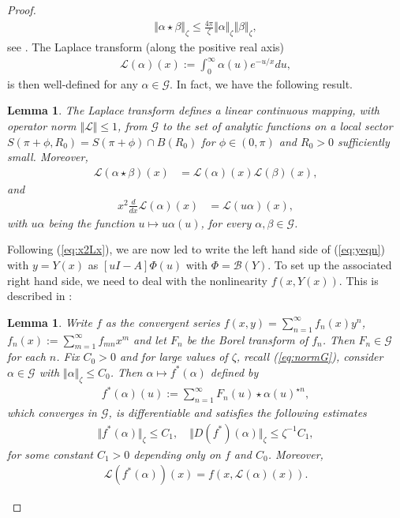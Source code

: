 \documentclass[reqno,12pt]{amsart}
\newcommand{\eqlab}[1]{\label{eq:#1}}
\renewcommand{\eqref}[1]{(\ref{eq:#1})}
\newcommand{\lemmalab}[1]{\label{lemma:#1}}
\newtheorem{lemma}[theorem]{Lemma}
\numberwithin{equation}{section}
\begin{document}
\begin{proof}
\begin{align*}
 \Vert \alpha\star \beta \Vert_\zeta \le \frac{4\pi}{\zeta}\Vert \alpha\Vert_\zeta \Vert \beta\Vert_\zeta,
\end{align*}
 see \cite[Proposition 4]{bonckaert2008a}.
The Laplace transform (along the positive real axis)
\begin{align*}
 \mathcal L(\alpha)(x) :=\int_0^\infty \alpha(u) e^{-u/x} du,
\end{align*}
is then well-defined for any $\alpha\in \mathcal G$. In fact, we have the following result. 
\begin{lemma}\cite[Proposition 3]{bonckaert2008a}\lemmalab{A1}
 The Laplace transform defines a linear continuous mapping, with operator norm $\Vert \mathcal L\Vert\le 1$, from $\mathcal G$ to the set of analytic functions on a local sector $S(\pi+\phi,R_0)=S(\pi+\phi)\cap B(R_0)$ for $\phi\in (0,\pi)$ and $R_0>0$ sufficiently small. Moreover, 
 \begin{align}
  \mathcal L(\alpha \star \beta)(x) &= \mathcal L(\alpha)(x)\mathcal L(\beta)(x),\nonumber
  \end{align}
  and
  \begin{align}
  x^2\frac{d}{dx}\mathcal L(\alpha)(x)&=\mathcal L(u\alpha)(x),\eqlab{x2Lx}
 \end{align}
 with $u\alpha$ being the function $u\mapsto u\alpha(u)$, 
for every $\alpha,\beta\in \mathcal G$.
\end{lemma}

Following \eqref{x2Lx}, we are now led to write the left hand side of \eqref{yeqn} with $y=Y(x)$ as $[u I -A]\Phi(u)$ with $\Phi = \mathcal B(Y)$. 
To set up the associated right hand side, we need to deal with the nonlinearity $f(x,Y(x))$. This is described in \cite[Proposition 5]{bonckaert2008a}:
\begin{lemma}
Write $f$ as the convergent series $f(x,y)=\sum_{n=1}^\infty f_{n}(x) y^n$, $f_n(x):=\sum_{m=1}^\infty f_{mn}x^m$ and let $F_n$ be the Borel transform of $f_n$. Then $F_n\in \mathcal G$ for each $n$. Fix $C_0>0$ and for large values of $\zeta$, recall \eqref{normG}, consider $\alpha\in \mathcal G$ with $\Vert \alpha\Vert_\zeta\le C_0$. Then $\alpha\mapsto f^*(\alpha)$ defined by
\begin{align*}
f^*(\alpha)(u):=\sum_{n=1}^\infty F_n(u) \star \alpha(u)^{\star n},
\end{align*}
which converges in $\mathcal G$, is differentiable and satisfies the following estimates
\begin{align}
 \Vert f^*(\alpha)\Vert_{\zeta}\le C_1,\quad 
 \Vert D(f^*)(\alpha)\Vert_{\zeta}\le \zeta^{-1} C_1,\eqlab{fstarest}
\end{align}
for some constant $C_1>0$ depending only on $f$ and $C_0$. 
Moreover,
\begin{align}
 \mathcal L(f^*(\alpha))(x) = f(x,\mathcal L(\alpha)(x)).\eqlab{Lf}
\end{align}


\end{lemma}
\end{proof}
\end{document}
